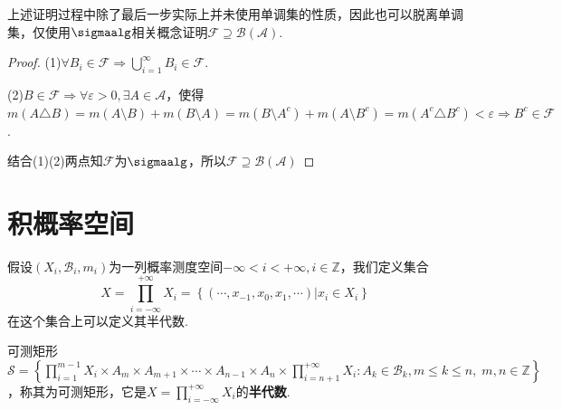 \begin{remark}
    上述证明过程中除了最后一步实际上并未使用单调集的性质，因此也可以脱离单调集，仅使用$\sigmaalg$相关概念证明$\mathcal{F} \supseteq \mathcal{B}(\mathcal{A})$.\par
    \begin{proof}
        (1)$\forall B_i \in \mathcal{F} \Rightarrow \bigcup_{i=1}^\infty{B_i} \in \mathcal{F}$.\par
        (2)$B \in \mathcal{F} \Rightarrow \forall \varepsilon>0,\exists A \in \mathcal{A}$，使得$m(A \triangle B)=m(A \setminus B)+m(B \setminus A)=m(B \setminus A^c)+m(A\setminus B^c)=m(A^c \triangle B^c)<\varepsilon \Rightarrow B^c \in \mathcal{F}$.\par
        结合(1)(2)两点知$\mathcal{F}$为$\sigmaalg$，所以$\mathcal{F} \supseteq \mathcal{B}(\mathcal{A})$
    \end{proof}
\end{remark}

\section{积概率空间}

假设$(X_i,\mathcal{B}_i,m_i)$为一列概率测度空间$-\infty<i<+\infty,i\in\mathbb{Z}$，我们定义集合
\[X=\prod_{i=-\infty}^{+\infty}{X_i}=\left\{(\cdots,x_{-1},x_0,x_1,\cdots)|x_i \in X_i\right\}\]
在这个集合上可以定义其半代数.
\begin{definition}{可测矩形}\label{def:1.10}
    $\mathcal{S}=\left\{ \prod_{i=1}^{m-1}{X_i} \times A_m \times A_{m+1} \times \cdots \times A_{n-1} \times A_n \times \prod_{i=n+1}^{+\infty}{X_i} : A_k \in \mathcal{B}_k, m \leqslant k \leqslant n,\;m,n \in \mathbb{Z}\right\}$，称其为可测矩形，它是$X=\prod_{i=-\infty}^{+\infty}{X_i}$的\textbf{半代数}.
\end{definition}

